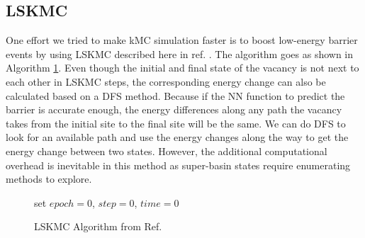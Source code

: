 \subsection{\acf{LSKMC}}
\label{Chap:Al/Vac:sec:LSKMC}
One effort we tried to make \ac{kMC} simulation faster is to boost low-energy barrier events by using \acf{LSKMC} described here in ref. \cite{fichthorn2013local}. The algorithm goes as shown in Algorithm \ref{algo:lskmc}. Even though the initial and final state of the vacancy is not next to each other in \ac{LSKMC} steps, the corresponding energy change can also be calculated based on a \ac{DFS} method. Because if the \ac{NN} function to predict the barrier is accurate enough, the energy differences along any path the vacancy takes from the initial site to the final site will be the same. We can do \ac{DFS} to look for an available path and use the energy changes along the way to get the energy change between two states. However, the additional computational overhead is inevitable in this method as super-basin states require enumerating methods to explore.

\begin{figure}[!htb]
  \centering
  \begin{minipage}{.75\linewidth}
    \begin{algorithm}[H]
      \caption{\acf{LSKMC} Algorithm from  Ref. \cite{fichthorn2013local}}\label{algo:lskmc}
      \begin{algorithmic}[1]
        \State set $epoch = 0$, $step = 0$, $time = 0$
        \Else
        \EndIf
        \EndIf

        \EndWhile
      \end{algorithmic}
    \end{algorithm}
  \end{minipage}
\end{figure}


